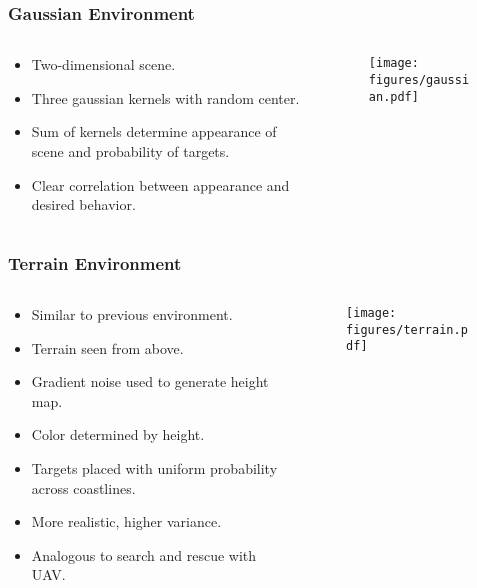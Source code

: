 \begin{frame}
    \frametitle{Gaussian Environment}
    \begin{columns}
        \begin{column}{0.5\textwidth}
            \begin{itemize}
                \item Two-dimensional scene.
                \item Three gaussian kernels with random center.
                \item Sum of kernels determine appearance of scene and probability of targets.
                \item Clear correlation between appearance and desired behavior.
            \end{itemize}
        \end{column}
        \begin{column}{0.5\textwidth}
            \begin{figure}
                \centering
                \texttt{[image: figures/gaussian.pdf]}
            \end{figure}
        \end{column}
    \end{columns}    
\end{frame}

\begin{frame}
    \frametitle{Terrain Environment}
    \begin{columns}
        \begin{column}{0.5\textwidth}
            \begin{itemize}
                \item Similar to previous environment.
                \item Terrain seen from above.
                \item Gradient noise used to generate height map.
                \item Color determined by height.
                \item Targets placed with uniform probability across coastlines.
                \item More realistic, higher variance.
                \item Analogous to search and rescue with UAV.
            \end{itemize}
        \end{column}
        \begin{column}{0.5\textwidth}
            \begin{figure}
                \centering
                \texttt{[image: figures/terrain.pdf]}
            \end{figure}
        \end{column}
    \end{columns}   
\end{frame}

